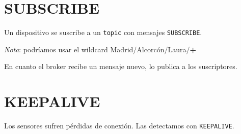 \documentclass[xcolor={x11names}]{beamer}
\begin{document}
\section{SUBSCRIBE}
\begin{frame}{\secname}
    Un dispositivo se suscribe a
    un \texttt{topic} con
    mensajes \texttt{SUBSCRIBE}.

    \vspace{1em}

    \begin{figure}
        
    \end{figure}


    \emph{Nota}: podríamos usar el wildcard
    {\color{Firebrick3}Madrid}/{\color{Gold3}Alcorcón}/{\color{DodgerBlue3}Laura}/{\color{OliveDrab4}\textbf{+}}
\end{frame}




\begin{frame}{\secname}
    En cuanto el broker recibe un
    mensaje nuevo, lo publica a los
    suscriptores.
    \begin{figure}
        
    \end{figure}
\end{frame}




\section{KEEPALIVE}
\begin{frame}{\secname}
    Los sensores sufren pérdidas de
    conexión. Las detectamos con
    \texttt{KEEPALIVE}.
    
    \begin{figure}
        
    \end{figure}
\end{frame}
\end{document}
